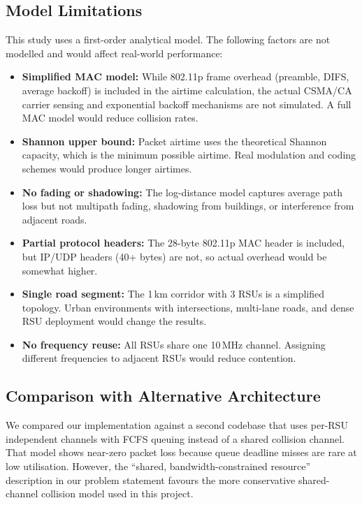 \documentclass[12pt, a4paper]{article}
\begin{document}
\subsection{Model Limitations}

This study uses a first-order analytical model.  The following factors are
not modelled and would affect real-world performance:

\begin{itemize}
    \item \textbf{Simplified MAC model:} While 802.11p frame overhead
    (preamble, DIFS, average backoff) is included in the airtime calculation,
    the actual CSMA/CA carrier sensing and exponential backoff mechanisms
    are not simulated.  A full MAC model would reduce collision rates.

    \item \textbf{Shannon upper bound:} Packet airtime uses the theoretical
    Shannon capacity, which is the minimum possible airtime.  Real modulation
    and coding schemes would produce longer airtimes.

    \item \textbf{No fading or shadowing:} The log-distance model captures
    average path loss but not multipath fading, shadowing from buildings, or
    interference from adjacent roads.

    \item \textbf{Partial protocol headers:} The 28-byte 802.11p MAC header
    is included, but IP/UDP headers (40+ bytes) are not, so actual overhead
    would be somewhat higher.

    \item \textbf{Single road segment:} The 1\,km corridor with 3 RSUs is a
    simplified topology.  Urban environments with intersections, multi-lane
    roads, and dense RSU deployment would change the results.

    \item \textbf{No frequency reuse:} All RSUs share one 10\,MHz channel.
    Assigning different frequencies to adjacent RSUs would reduce contention.
\end{itemize}

\subsection{Comparison with Alternative Architecture}

We compared our implementation against a second codebase that uses per-RSU
independent channels with FCFS queuing instead of a shared collision channel.
That model shows near-zero packet loss because queue deadline misses are
rare at low utilisation.  However, the ``shared, bandwidth-constrained
resource'' description in our problem statement favours the more conservative
shared-channel collision model used in this project.
\end{document}
